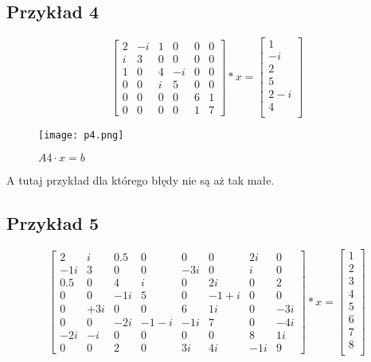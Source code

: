\documentclass{article}
\begin{document}
\subsection*{Przykład 4}
\vspace{12pt}
\[\begin{bmatrix}
    2 & -i & 1 & 0 & 0 & 0 \\
    i & 3 & 0 & 0 & 0 & 0 \\
    1 & 0 & 4 & -i & 0 & 0 \\
    0 & 0 & i & 5 & 0 & 0 \\
    0 & 0 & 0 & 0 & 6 & 1 \\
    0 & 0 & 0 & 0 & 1 & 7
\end{bmatrix} * x = 
\begin{bmatrix} 1 \\ -i \\ 2 \\ 5 \\ 2-i \\ 4 \\
\end{bmatrix}
 \]

\begin{figure}[hbt!]
  \centering
    \texttt{[image: p4.png]}
    \caption{$A4 \cdot x = b$}
    \label{fig:example}
\end{figure}

A tutaj przykład dla którego błędy nie są aż tak małe.

\subsection*{Przykład 5}
\vspace{12pt}

\[\begin{bmatrix}
    2 & i & 0.5 & 0 & 0 & 0 & 2i & 0 \\
    -1i & 3 & 0 & 0 & -3i & 0 & i & 0 \\
    0.5 & 0 & 4 & i & 0 & 2i & 0 & 2 \\
    0 & 0 & -1i & 5 & 0 & -1+i & 0 & 0 \\
    0 & +3i & 0 & 0 & 6 & 1i & 0 & -3i \\
    0 & 0 & -2i & -1-i & -1i & 7 & 0 & -4i \\
    -2i & -i & 0 & 0 & 0 & 0 & 8 & 1i \\
    0 & 0 & 2 & 0 & 3i & 4i & -1i & 9
\end{bmatrix}
 * x = 
\begin{bmatrix} 1 \\ 2 \\ 3 \\ 4 \\ 5 \\ 6 \\ 7 \\ 8 \\
\end{bmatrix}
 \]
\end{document}
